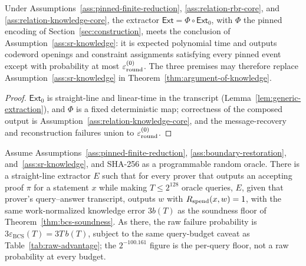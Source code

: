 \begin{lemma}
\label{lem:sr-knowledge-reduction}
Under Assumptions~\ref{ass:pinned-finite-reduction},
\ref{ass:relation-rbr-core}, and \ref{ass:relation-knowledge-core}, the
extractor \(\mathsf{Ext}=\Phi\circ\mathsf{Ext}_0\), with \(\Phi\) the pinned
encoding of Section~\ref{sec:construction}, meets the conclusion of
Assumption~\ref{ass:sr-knowledge}: it is expected polynomial time and outputs
codeword openings and constraint assignments satisfying every pinned event
except with probability at most \(\varepsilon_{\rm round}^{(0)}\).  The three
premises may therefore replace Assumption~\ref{ass:sr-knowledge} in
Theorem~\ref{thm:argument-of-knowledge}.
\end{lemma}

\begin{proof}
\(\mathsf{Ext}_0\) is straight-line and linear-time in the transcript
(Lemma~\ref{lem:generic-extraction}), and \(\Phi\) is a fixed deterministic
map; correctness of the composed output is
Assumption~\ref{ass:relation-knowledge-core}, and the message-recovery and
reconstruction failures union to \(\varepsilon_{\rm round}^{(0)}\).
\end{proof}

\begin{theorem}
\label{thm:argument-of-knowledge}
Assume Assumptions~\ref{ass:pinned-finite-reduction},
\ref{ass:boundary-restoration}, and~\ref{ass:sr-knowledge}, and SHA-256 as a
programmable random oracle.  There is a straight-line extractor \(E\) such that
for every prover that outputs an accepting proof \(\pi\) for a statement \(x\)
while making \(T\le2^{128}\) oracle queries, \(E\), given that prover's
query--answer transcript, outputs \(w\) with \(R_{\mathrm{spend}}(x,w)=1\), with the
same work-normalized knowledge error \(3b(T)\) as the soundness floor of
Theorem~\ref{thm:bcs-soundness}.  As there, the raw failure probability is
\(3\varepsilon_{\mathrm{BCS}}(T)=3T\,b(T)\), subject to the same query-budget
caveat as Table~\ref{tab:raw-advantage}; the \(2^{-100.161}\) figure is the
per-query floor, not a raw probability at every budget.
\end{theorem}

